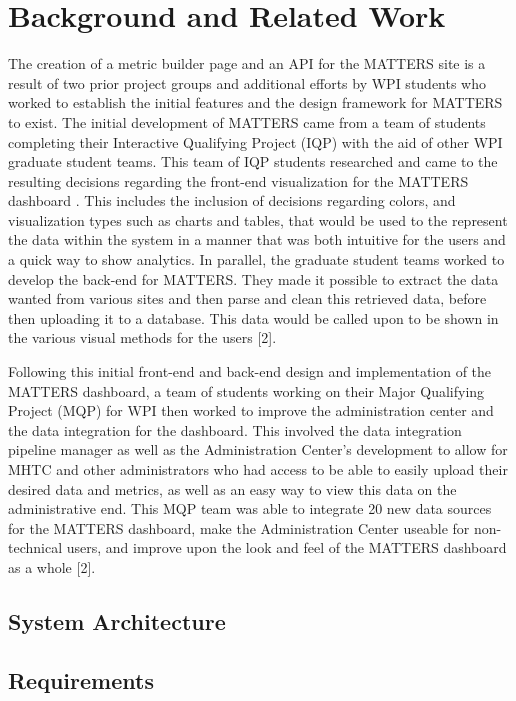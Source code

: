 \chapter{Background and Related Work}

The creation of a metric builder page and an API for the MATTERS site is a result of two prior project groups and additional efforts by WPI students who worked to establish the initial features and the design framework for MATTERS to exist. The initial development of MATTERS came from a team of students completing their Interactive Qualifying Project (IQP) with the aid of other WPI graduate student teams. This team of IQP students researched and came to the resulting decisions regarding the front-end visualization for the MATTERS dashboard \cite{prevreport}. This includes the inclusion of decisions regarding colors, and visualization types such as charts and tables, that would be used to the represent the data within the system in a manner that was both intuitive for the users and a quick way to show analytics. In parallel, the graduate student teams worked to develop the back-end for MATTERS. They made it possible to extract the data wanted from various sites and then parse and clean this retrieved data, before then uploading it to a database. This data would be called upon to be shown in the various visual methods for the users [2].

Following this initial front-end and back-end design and implementation of the MATTERS dashboard, a team of students working on their Major Qualifying Project (MQP) for WPI then worked to improve the administration center and the data integration for the dashboard. This involved the data integration pipeline manager as well as the Administration Center’s development to allow for MHTC and other administrators who had access to be able to easily upload their desired data and metrics, as well as an easy way to view this data on the administrative end. This MQP team was able to integrate 20 new data sources for the MATTERS dashboard, make the Administration Center useable for non-technical users, and improve upon the look and feel of the MATTERS dashboard as a whole [2].

\section{System Architecture}

\section{Requirements}

